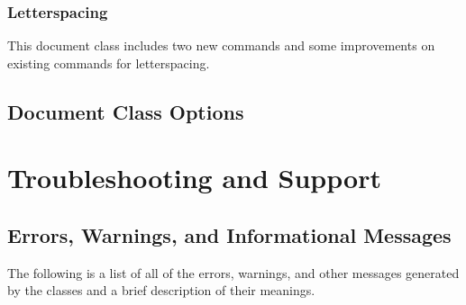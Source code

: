 \documentclass{tufte-book}
\begin{document}
\subsection{Letterspacing}\label{sec:letterspacing}
This document class includes two new commands and some improvements on
existing commands for letterspacing.

\section{Document Class Options}\label{sec:options}

\chapter{Troubleshooting and Support}
\label{ch:troubleshooting}

\section{Errors, Warnings, and Informational Messages}\label{sec:tl-messages}
The following is a list of all of the errors, warnings, and other messages generated by the classes and a brief description of their meanings.

\backmatter



\end{document}
